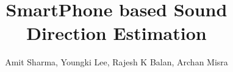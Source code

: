 \documentclass{sig-alternate-05-2015}
\begin{document}


\title{SmartPhone based Sound Direction Estimation}

%

%
\author{
%
%
\alignauthor
Amit Sharma, Youngki Lee, Rajesh K Balan, Archan Misra\\     
       \\
       \\
}




\end{document}
